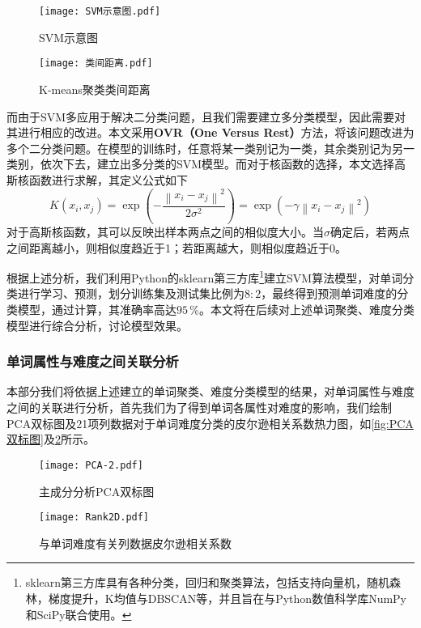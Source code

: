 \documentclass{MathModeling}
\begin{document}
	\begin{figure}[H]
		\centering
		\begin{minipage}{0.48\linewidth}
			\centering
			\texttt{[image: SVM示意图.pdf]}
			\caption{SVM示意图}
			\label{fig:svmpicture}
		\end{minipage}
		\begin{minipage}{0.48\linewidth}
			\centering
			\texttt{[image: 类间距离.pdf]}
			\caption{K-means聚类类间距离}
			\label{fig:类间距离}
		\end{minipage}
	\end{figure}

	而由于SVM多应用于解决二分类问题，且我们需要建立多分类模型，因此需要对其进行相应的改进。本文采用\textbf{OVR（One Versus Rest）}方法，将该问题改进为多个二分类问题\textcolor{blue}{\cite{psvm}}。在模型的训练时，任意将某一类别记为一类，其余类别记为另一类别，依次下去，建立出多分类的SVM模型。而对于核函数的选择，本文选择高斯核函数进行求解，其定义公式如下
	\begin{equation}
		K\left(x_i, x_j\right)=\exp \left(-\frac{\left\|x_i-x_j\right\|^{2}}{2\sigma^{2}}\right)=\exp \left(-\gamma \left\|x_i-x_j\right\|^{2}\right) \label{fgauss}
	\end{equation}
	对于高斯核函数，其可以反映出样本两点之间的相似度大小。当$\sigma$确定后，若两点之间距离越小，则相似度趋近于1；若距离越大，则相似度趋近于0。

	根据上述分析，我们利用Python的sklearn第三方库\textcolor{blue}{\footnote{sklearn第三方库具有各种分类，回归和聚类算法，包括支持向量机，随机森林，梯度提升，K均值与DBSCAN等，并且旨在与Python数值科学库NumPy和SciPy联合使用。}}建立SVM算法模型，对单词分类进行学习、预测，划分训练集及测试集比例为$8:2$，最终得到预测单词难度的分类模型，通过计算，其准确率高达$95\,\%$。本文将在后续对上述单词聚类、难度分类模型进行综合分析，讨论模型效果。

	\subsubsection{单词属性与难度之间关联分析}
	本部分我们将依据上述建立的单词聚类、难度分类模型的结果，对单词属性与难度之间的关联进行分析，首先我们为了得到单词各属性对难度的影响，我们绘制PCA双标图及21项列数据对于单词难度分类的皮尔逊相关系数热力图，如\textcolor{blue}{\cref{fig:PCA双标图}}及\textcolor{blue}{\cref{fig:21项列数据对单词难度分类皮尔逊相关系数}}所示。

	\begin{figure}[H]
		\centering
		\begin{minipage}{0.48\linewidth}
			\centering
			\texttt{[image: PCA-2.pdf]}
			\caption{主成分分析PCA双标图}
			\label{fig:PCA双标图}
		\end{minipage}
		\begin{minipage}{0.48\linewidth}
			\centering
			\texttt{[image: Rank2D.pdf]}
			\caption{与单词难度有关列数据皮尔逊相关系数}
			\label{fig:21项列数据对单词难度分类皮尔逊相关系数}
		\end{minipage}
	\end{figure}
\end{document}
